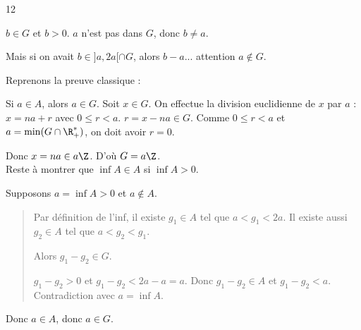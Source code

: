 \begin{correction}{12}
\begin{enumerate}
\begin{enumerate}
            $b \in G$ et $b > 0$. $a$ n'est pas dans $G$, donc $b \neq a$.

            Mais si on avait $b \in ]a, 2a[ \cap G$, alors $b-a$... attention $a \notin G$.

            Reprenons la preuve classique :

            Si $a \in A$, alors $a \in G$.
            Soit $x \in G$. On effectue la division euclidienne de $x$ par $a$ : $x = n a + r$ avec $0 \le r < a$.
            $r = x - na \in G$. Comme $0 \le r < a$ et $a = \min(G \cap \R^*_+)$, on doit avoir $r=0$.

            Donc $x = na \in a\Z$. D'où $G = a\Z$. \\


            Reste à montrer que $\inf A \in A$ si $\inf A > 0$.

            Supposons $a = \inf A > 0$ et $a \notin A$.
            \begin{quote}
                Par définition de l'inf, il existe $g_1 \in A$ tel que $a < g_1 < 2a$.
                Il existe aussi $g_2 \in A$ tel que $a < g_2 < g_1$.
                
                Alors $g_1 - g_2 \in G$.
                
                $g_1 - g_2 > 0$ et $g_1 - g_2 < 2a - a = a$.
                Donc $g_1 - g_2 \in A$ et $g_1 - g_2 < a$.
                Contradiction avec $a = \inf A$.
            \end{quote}
            Donc $a \in A$, donc $a \in G$.
    \end{enumerate}
\end{enumerate}
\end{correction}

